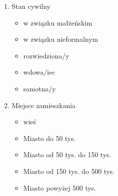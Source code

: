 \documentclass[a4paper,12pt,twoside,openright]{mwrep}
\begin{document}
\begin{enumerate}[label=(\Roman*)]
			\vspace{\baselineskip} 
	\item{Stan cywilny}
		\begin{itemize}
			\item{w związku małżeńskim}
			\item{w związku nieformalnym}
			\item{rozwiedziona/y}
			\item{wdowa/iec}
			\item{samotna/y}
		\end{itemize}
			\vspace{\baselineskip} 
	\item{Miejsce zamieszkania}
		\begin{itemize}
			\item{wieś}
			\item{Miasto do 50 tys.}
			\item{Miasto od 50 tys. do 150 tys.}
			\item{Miasto od 150 tys. do 500 tys.}
			\item{Miasto powyżej 500 tys.}
		\end{itemize}
			\vspace{\baselineskip} 

\end{enumerate}
\end{document}
